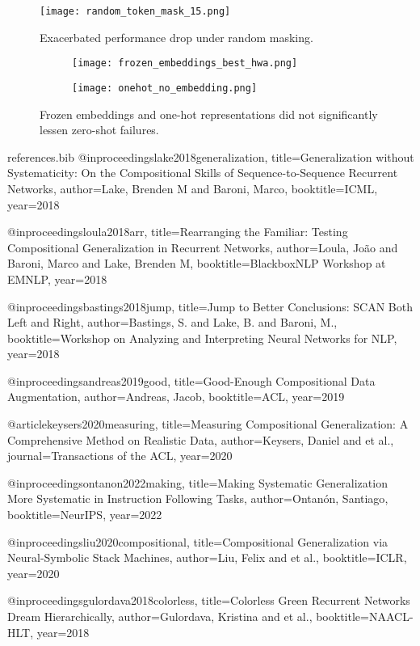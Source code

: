 \documentclass{article}
\begin{document}
\begin{figure}[h]
  \centering
  \texttt{[image: random\_token\_mask\_15.png]}
  \caption{Exacerbated performance drop under random masking.}
  \label{fig:random_token_mask15}
\end{figure}

\begin{figure}[h]
  \centering
  \begin{subfigure}{0.45\linewidth}
    \texttt{[image: frozen\_embeddings\_best\_hwa.png]}
  \end{subfigure}
  \quad
  \begin{subfigure}{0.45\linewidth}
    \texttt{[image: onehot\_no\_embedding.png]}
  \end{subfigure}
  \caption{Frozen embeddings and one-hot representations did not significantly lessen zero-shot failures.}
  \label{fig:embedding_comparison}
\end{figure}

\clearpage

\begin{filecontents}{references.bib}
@inproceedings{lake2018generalization,
  title={Generalization without Systematicity: On the Compositional Skills of Sequence-to-Sequence Recurrent Networks},
  author={Lake, Brenden M and Baroni, Marco},
  booktitle={ICML},
  year={2018}
}

@inproceedings{loula2018arr,
  title={Rearranging the Familiar: Testing Compositional Generalization in Recurrent Networks},
  author={Loula, Jo\~ao and Baroni, Marco and Lake, Brenden M},
  booktitle={BlackboxNLP Workshop at EMNLP},
  year={2018}
}

@inproceedings{bastings2018jump,
  title={Jump to Better Conclusions: SCAN Both Left and Right},
  author={Bastings, S. and Lake, B. and Baroni, M.},
  booktitle={Workshop on Analyzing and Interpreting Neural Networks for NLP},
  year={2018}
}

@inproceedings{andreas2019good,
  title={Good-Enough Compositional Data Augmentation},
  author={Andreas, Jacob},
  booktitle={ACL},
  year={2019}
}

@article{keysers2020measuring,
  title={Measuring Compositional Generalization: A Comprehensive Method on Realistic Data},
  author={Keysers, Daniel and et al.},
  journal={Transactions of the ACL},
  year={2020}
}

@inproceedings{ontanon2022making,
  title={Making Systematic Generalization More Systematic in Instruction Following Tasks},
  author={Ontan{\'o}n, Santiago},
  booktitle={NeurIPS},
  year={2022}
}

@inproceedings{liu2020compositional,
  title={Compositional Generalization via Neural-Symbolic Stack Machines},
  author={Liu, Felix and et al.},
  booktitle={ICLR},
  year={2020}
}

@inproceedings{gulordava2018colorless,
  title={Colorless Green Recurrent Networks Dream Hierarchically},
  author={Gulordava, Kristina and et al.},
  booktitle={NAACL-HLT},
  year={2018}
}
\end{filecontents}



\end{document}
